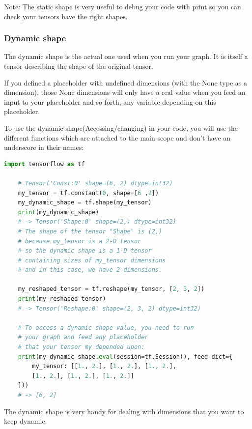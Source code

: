 Note: The static shape is very useful to debug your code with print so you can check your tensors have the right shapes.

\subsubsection{Dynamic shape}

The dynamic shape is the actual one used when you run your graph. It is itself a tensor describing the shape of the original tensor.

If you defined a placeholder with undefined dimensions (with the None type as a dimension), those None dimensions will only have a real value when you feed an input to your placeholder and so forth, any variable depending on this placeholder.

To use the dynamic shape(Accessing/changing) in your code, you will use the different functions which are attached to the main scope and don’t have an underscore in their names:

\begin{lstlisting}[language=Python]
    import tensorflow as tf

    # Tensor('Const:0' shape=(6, 2) dtype=int32)
    my_tensor = tf.constant(0, shape=[6 ,2]) 
    my_dynamic_shape = tf.shape(my_tensor) 
    print(my_dynamic_shape)
    # -> Tensor('Shape:0' shape=(2,) dtype=int32)
    # The shape of the tensor "Shape" is (2,) 
    # because my_tensor is a 2-D tensor
    # so the dynamic shape is a 1-D tensor
    # containing sizes of my_tensor dimensions
    # and in this case, we have 2 dimensions.
    
    my_reshaped_tensor = tf.reshape(my_tensor, [2, 3, 2]) 
    print(my_reshaped_tensor)
    # -> Tensor('Reshape:0' shape=(2, 3, 2) dtype=int32)
    
    # To access a dynamic shape value, you need to run 
    # your graph and feed any placeholder 
    # that your tensor my depended upon:
    print(my_dynamic_shape.eval(session=tf.Session(), feed_dict={
        my_tensor: [[1., 2.], [1., 2.], [1., 2.], 
        [1., 2.], [1., 2.], [1., 2.]]
    }))
    # -> [6, 2]
\end{lstlisting}

The dynamic shape is very handy for dealing with dimensions that you want to keep dynamic.
